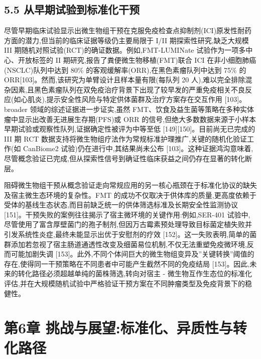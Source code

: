 \subsection{5.5 从早期试验到标准化干预}\label{ux4eceux65e9ux671fux8bd5ux9a8cux5230ux6807ux51c6ux5316ux5e72ux9884}

尽管早期临床试验显示出微生物组干预在克服免疫检查点抑制剂(ICI)原发性耐药方面的潜力,但当前的临床证据等级仍主要局限于 I/II 期探索性研究,缺乏大规模 III 期随机对照试验(RCT)的确证数据。例如,FMT-LUMINate 试验作为一项多中心、开放标签的 II 期研究,报告了粪便微生物移植(FMT)联合 ICI 在非小细胞肺癌(NSCLC)队列中达到 80\% 的客观缓解率(ORR),在黑色素瘤队列中达到 75\% 的 ORR{[}103{]}。然而,该研究为单臂设计且样本量有限(每队列 20 人),难以完全排除混杂因素,且黑色素瘤队列在双免疫治疗背景下出现了较早发的严重免疫相关不良反应(如心肌炎),提示安全性风险与特定供体菌群及治疗方案存在交互作用 {[}103{]}。 broader 领域的综述证据进一步证实,虽然 FMT、饮食及益生菌等策略在多种实体瘤中显示出改善无进展生存期(PFS)或 ORR 的信号,但绝大多数数据来源于小样本早期试验或观察性队列,证据确定性被评为中等至低 {[}149{]}{[}150{]}。目前尚无已完成的 III 期 RCT 数据支持将微生物组疗法作为常规标准护理推广,关键的随机化验证工作(如 CanBiome2 试验)仍在进行中,其结果尚未公布 {[}103{]}。这种证据鸿沟意味着,尽管概念验证已完成,但从探索性信号到确证性临床获益之间仍存在显著的转化断层。

阻碍微生物组干预从概念验证走向常规应用的另一核心瓶颈在于标准化协议的缺失及宿主微生态环境的复杂性。FMT 的成功不仅取决于供体库的质量,更高度依赖于受体的基线生态状态,而目前缺乏统一的供体筛选标准及长期安全性监测协议 {[}151{]}。干预失败的案例往往揭示了宿主微环境的关键作用:例如,SER-401 试验中,尽管使用了富含厚壁菌门的孢子制剂,但因万古霉素预处理导致目标菌定植失败并引发系统性炎症,最终未能显示出优于安慰剂的疗效 {[}152{]}。这一失败表明,简单的菌群添加若忽视了宿主肠道通透性改变及细菌易位机制,不仅无法重塑免疫微环境,反而可能加剧失调 {[}153{]}。此外,不同个体间巨大的微生物组变异及''关键转换''阈值的存在,使得同一干预策略在不同患者中可能产生截然不同的免疫结局 {[}153{]}。因此,未来的转化路径必须超越单纯的菌株筛选,转向对宿主 - 微生物互作生态位的标准化评估,并在大规模随机试验中严格验证干预方案在不同肿瘤类型及免疫背景下的稳健性。

\section{第6章 挑战与展望:标准化、异质性与转化路径}\label{ux7b2c6ux7ae0-ux6311ux6218ux4e0eux5c55ux671bux6807ux51c6ux5316ux5f02ux8d28ux6027ux4e0eux8f6cux5316ux8defux5f84}

